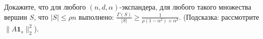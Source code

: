 Докажите, что для любого $(n, d, \alpha)$-экспандера, для любого такого множества вершин $S$, что $|S| \le \rho n$ выполнено:
$\frac{\Gamma(S)}{|S|} \ge \frac{1}{\rho(1 - \alpha^2) + \alpha^2}$. (Подсказка: рассмотрите $\| A \mathbf{1}_s \|_2^2$).